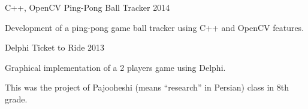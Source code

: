 \begin{cventries}

  \cventry
    {C++, OpenCV} %
    {Ping-Pong Ball Tracker} %
    {} %
    {2014} %
    {
      \begin{cvitems} %
        \item {Development of a ping-pong game ball tracker using C++ and OpenCV features.}
      \end{cvitems}
    }

  \cventry
    {Delphi} %
    {Ticket to Ride} %
    {} %
    {2013} %
    {
      \begin{cvitems} %
        \item {Graphical implementation of a 2 players game using Delphi.}
        \item {This was the project of Pajooheshi (means ``research” in Persian) class in 8th grade.}
      \end{cvitems}
    }

\end{cventries}

